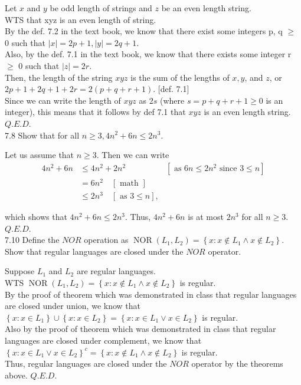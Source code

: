 \documentclass[10pt]{article}
\begin{document}
\begin{enumerate}[label={}]
            Let $x$ and $y$ be odd length of strings and $z$ be an even length string.\\
            WTS that xyz is an even length of string.\\
            By the def. 7.2 in the text book, we know that there exist some integers p, q $\geq$ 0 such that $|x|=2 p+1,|y|=2 q+1$.\\
            Also, by the def. 7.1 in the text book, we know that there exists some integer r $\geq$ 0 such that $|z|=2 r$.\\
            Then, the length of the string $x y z$ is the sum of the lengths of $x, y$, and $z$, or $2 p+1+2 q+1+2 r=2(p+q+r+1)$. [def. 7.1]\\
            Since we can write the length of $x y z$ as $2s$ (where $s=p+q+r+1 \geq 0$ is an integer), this means that it follows by def 7.1 that $x y z$ is an even length string. $Q.E.D.$\\


            7.8 Show that for all $n \geq 3,4 n^2+6 n \leq 2 n^3$.

            Let us assume that $n \geq 3$. Then we can write
            $$
                  \begin{aligned}
                        4 n^2+6 n & \leq 4 n^2+2 n^2
                                  & {\left[\text { as } 6 n \leq 2 n^2 \text { since } 3 \leq n\right] } \\
                                  & = 6 n^2 \quad[\text { math }]                                        \\
                                  & \leq 2 n^3 \quad[\text { as } 3 \leq n],
                  \end{aligned}
            $$

            which shows that $4 n^2+6 n \leq 2 n^3$.
            Thus, $4 n^2+6 n$ is at most $2 n^3$ for all $n \geq 3$. $Q.E.D.$\\

            7.10 Define the $N O R$ operation as $\operatorname{NOR}\left(L_1, L_2\right)=\left\{x: x \notin L_1 \wedge x \notin L_2\right\}$. Show that regular languages are closed under the $N O R$ operator.

            Suppose $L_1$ and $L_2$ are regular languages.\\
            WTS $\operatorname{NOR}\left(L_1, L_2\right)=\left\{x: x \notin L_1 \wedge x \notin L_2\right\}$ is regular.\\
            By the proof of theorem which was demonstrated in class that regular languages are closed under union, we know that
            $\left\{x: x \in L_1\right\} \cup \left\{x:x \in L_2\right\} = \left\{x: x \in L_1 \vee x \in L_2\right\}$ is regular.\\
            Also by the proof of theorem which was demonstrated in class that regular languages are closed under complement, we know that $\left\{x: x \in L_1 \vee x \in L_2\right\}^c = \left\{x: x \notin L_1 \wedge x \notin L_2\right\}$ is regular. \\
            Thus, regular languages are closed under the $N O R$ operator by the theorems above. $Q.E.D.$


\end{enumerate}
\end{document}
